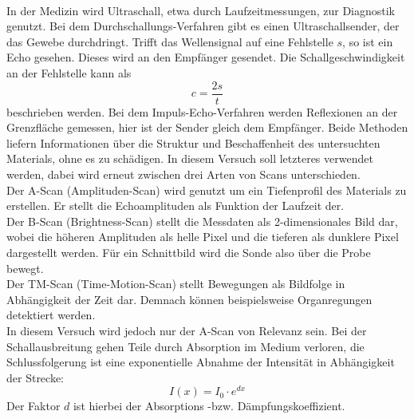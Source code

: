 \\
\noindent In der Medizin wird Ultraschall, etwa durch Laufzeitmessungen, zur Diagnostik
genutzt. Bei dem Durchschallungs-Verfahren gibt es einen Ultraschallsender,
der das Gewebe durchdringt. Trifft das Wellensignal auf eine Fehlstelle $s$, so 
ist ein Echo gesehen. Dieses wird an den Empfänger gesendet. Die Schallgeschwindigkeit 
an der Fehlstelle kann als
\begin{equation}
    \label{eqn:3}
    c = \frac{2s}{t}
\end{equation}
beschrieben werden.
Bei dem Impuls-Echo-Verfahren werden Reflexionen an der Grenzfläche gemessen, hier 
ist der Sender gleich dem Empfänger. Beide Methoden liefern Informationen über
die Struktur und Beschaffenheit des untersuchten Materials, ohne es zu schädigen.
In diesem Versuch soll letzteres verwendet werden, dabei wird erneut zwischen 
drei Arten von Scans unterschieden.
\vspace{0.5em}
\\
\noindent Der A-Scan (Amplituden-Scan) wird genutzt um ein Tiefenprofil des 
Materials zu erstellen. Er stellt die Echoamplituden als Funktion der Laufzeit
der.
\vspace{0.5em}
\\
\noindent Der B-Scan (Brightness-Scan) stellt die Messdaten als 2-dimensionales 
Bild dar, wobei die höheren Amplituden als helle Pixel und die tieferen als 
dunklere Pixel dargestellt werden. Für ein Schnittbild wird die Sonde also 
über die Probe bewegt.
\vspace{0.5em}
\\
\noindent Der TM-Scan (Time-Motion-Scan) stellt Bewegungen als Bildfolge in 
Abhängigkeit der Zeit dar. Demnach können beispielsweise Organregungen 
detektiert werden.
\vspace{0.5em}
\\
In diesem Versuch wird jedoch nur der A-Scan von Relevanz sein.
Bei der Schallausbreitung gehen Teile durch Absorption im Medium verloren, die 
Schlussfolgerung ist eine exponentielle Abnahme der Intensität in Abhängigkeit 
der Strecke:
\begin{equation}
    \label{eqn:4}
    I(x) = I_0 \cdot e^{dx}
\end{equation}
Der Faktor $d$ ist hierbei der Absorptions -bzw. Dämpfungskoeffizient.

